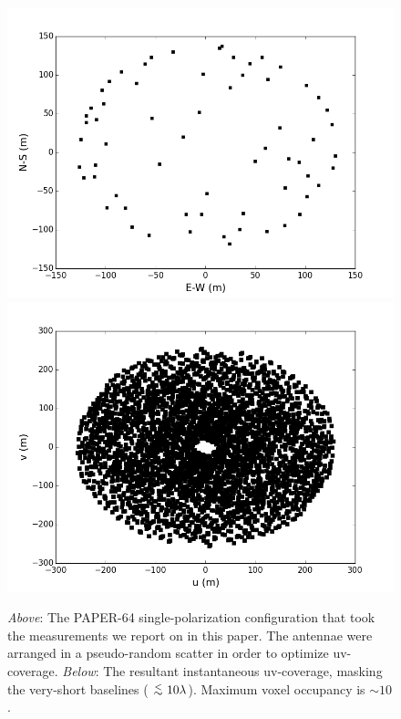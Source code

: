 \documentclass[useAMS,usenatbib]{mn2e}
\newcommand {\aplt} {\ {\raise-.5ex\hbox{$\buildrel<\over\sim$}}\ }
\begin{document}
\begin{figure}
\includegraphics[width=\columnwidth]{psa64imageconfig.png}
\includegraphics[width=\columnwidth]{psa64uvcoverage.png}
\caption{\textit{Above}: The PAPER-64 single-polarization configuration that took the measurements we report on in this paper. The antennae were arranged in a pseudo-random scatter in order to optimize uv-coverage. \textit{Below}: The resultant instantaneous uv-coverage, masking the very-short baselines ($\aplt 10 \lambda$). Maximum voxel occupancy is $\sim10$.}
\label{fig:config}
\end{figure}
\end{document}
